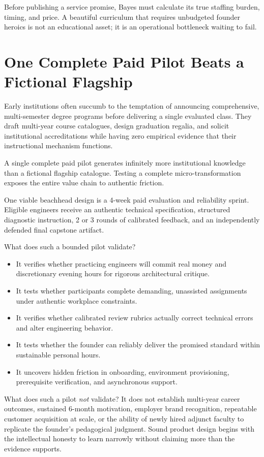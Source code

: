 Before publishing a service promise, Bayes must calculate its true staffing burden, timing, and price. A beautiful curriculum that requires unbudgeted founder heroics is not an educational asset; it is an operational bottleneck waiting to fail.

\section{One Complete Paid Pilot Beats a Fictional Flagship}

Early institutions often succumb to the temptation of announcing comprehensive, multi-semester degree programs before delivering a single evaluated class. They draft multi-year course catalogues, design graduation regalia, and solicit institutional accreditations while having zero empirical evidence that their instructional mechanism functions.

A single complete paid pilot generates infinitely more institutional knowledge than a fictional flagship catalogue. Testing a complete micro-transformation exposes the entire value chain to authentic friction. 

One viable beachhead design is a 4-week paid evaluation and reliability sprint. Eligible engineers receive an authentic technical specification, structured diagnostic instruction, 2 or 3 rounds of calibrated feedback, and an independently defended final capstone artifact.

What does such a bounded pilot validate?
\begin{itemize}[leftmargin=*]
\item It verifies whether practicing engineers will commit real money and discretionary evening hours for rigorous architectural critique.
\item It tests whether participants complete demanding, unassisted assignments under authentic workplace constraints.
\item It verifies whether calibrated review rubrics actually correct technical errors and alter engineering behavior.
\item It tests whether the founder can reliably deliver the promised standard within sustainable personal hours.
\item It uncovers hidden friction in onboarding, environment provisioning, prerequisite verification, and asynchronous support.
\end{itemize}

What does such a pilot \emph{not} validate? It does not establish multi-year career outcomes, sustained 6-month motivation, employer brand recognition, repeatable customer acquisition at scale, or the ability of newly hired adjunct faculty to replicate the founder's pedagogical judgment. Sound product design begins with the intellectual honesty to learn narrowly without claiming more than the evidence supports.

